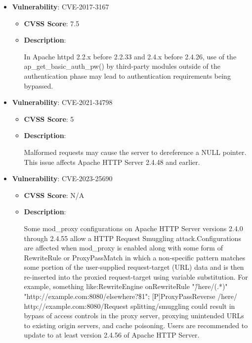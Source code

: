 \documentclass{article}
\begin{document}
\begin{itemize}
        \item \textbf{Vulnerability}: CVE-2017-3167
        \begin{itemize}
            \item \textbf{CVSS Score}:  7.5 
            \item \textbf{Description}:
            \parbox[t]{0.9\linewidth}{
                \ttfamily In Apache httpd 2.2.x before 2.2.33 and 2.4.x before 2.4.26, use of the ap\_get\_basic\_auth\_pw() by third-party modules outside of the authentication phase may lead to authentication requirements being bypassed.
            }
        \end{itemize}
    
        \item \textbf{Vulnerability}: CVE-2021-34798
        \begin{itemize}
            \item \textbf{CVSS Score}:  5 
            \item \textbf{Description}:
            \parbox[t]{0.9\linewidth}{
                \ttfamily Malformed requests may cause the server to dereference a NULL pointer. This issue affects Apache HTTP Server 2.4.48 and earlier.
            }
        \end{itemize}
    
        \item \textbf{Vulnerability}: CVE-2023-25690
        \begin{itemize}
            \item \textbf{CVSS Score}:  N/A 
            \item \textbf{Description}:
            \parbox[t]{0.9\linewidth}{
                \ttfamily Some mod\_proxy configurations on Apache HTTP Server versions 2.4.0 through 2.4.55 allow a HTTP Request Smuggling attack.Configurations are affected when mod\_proxy is enabled along with some form of RewriteRule or ProxyPassMatch in which a non-specific pattern matches some portion of the user-supplied request-target (URL) data and is then re-inserted into the proxied request-target using variable substitution. For example, something like:RewriteEngine onRewriteRule "\^/here/(.*)" "http://example.com:8080/elsewhere?\$1"; [P]ProxyPassReverse /here/ http://example.com:8080/Request splitting/smuggling could result in bypass of access controls in the proxy server, proxying unintended URLs to existing origin servers, and cache poisoning. Users are recommended to update to at least version 2.4.56 of Apache HTTP Server.
            }
        \end{itemize}
    

\end{itemize}
\end{document}
